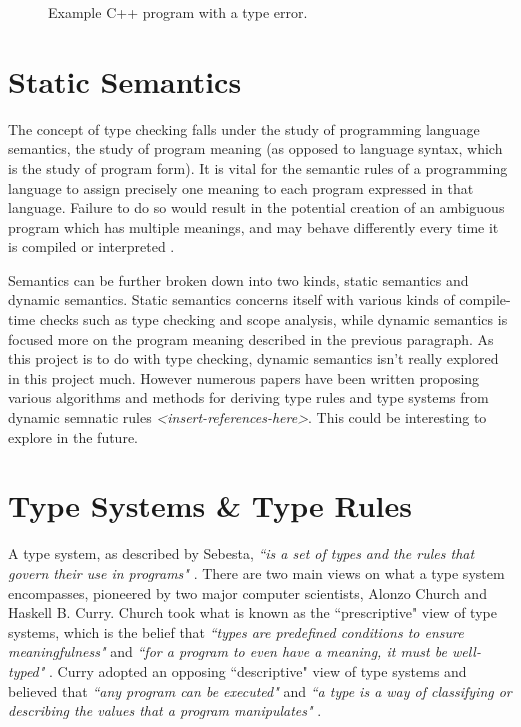 \documentclass{UoYCSproject}
\begin{document}
\begin{figure}
\lstset{language=C++,
    basicstyle=\footnotesize\ttfamily,
    numbers=left,
    frame=single
    }

\caption{Example C++ program with a type error.}
\label{fig:C++TypeError}
\end{figure}

\section{Static Semantics}
The concept of type checking falls under the study of programming language
semantics, the study of program meaning (as opposed to language syntax, which is
the study of program form). It is vital for the semantic rules of a programming
language to assign precisely one meaning to each program expressed in that
language. Failure to do so would result in the potential creation of an
ambiguous program which has multiple meanings, and may behave differently every
time it is compiled or interpreted \cite[p.~114]{Sebesta}.

Semantics can be further broken down into two kinds, static semantics and
dynamic semantics. Static semantics concerns itself with various kinds
of compile-time checks such as type checking and scope analysis, while dynamic
semantics is focused more on the program meaning described in the previous
paragraph. As this project is to do with type checking, dynamic semantics isn't
really explored in this project much. However numerous papers have been written
proposing various algorithms and methods for deriving type rules and type
systems from dynamic semnatic rules \textit{<insert-references-here>}. This could
be interesting to explore in the future.

\section{Type Systems \& Type Rules}
\label{sec:Chap1TypeSystems}

A type system, as described by Sebesta, \textit{``is a set of types and the rules that
    govern their use in programs"} \cite[6, p.~309]{Sebesta}.
There are two main views on what a type system encompasses, pioneered by two
major computer scientists, Alonzo Church and Haskell B. Curry.
Church took what is known as the ``prescriptive" view of type systems, which is
the belief that \textit{``types are predefined conditions to ensure meaningfulness"}
and \textit{``for a program to even have a meaning, it must be well-typed"}
\cite{NeilJones}. Curry adopted an opposing ``descriptive" view of type systems
and believed that \textit{``any program can be executed"} and \textit{``a type
    is a way of classifying or describing the values that a program manipulates"}
\cite{NeilJones}.
\end{document}
